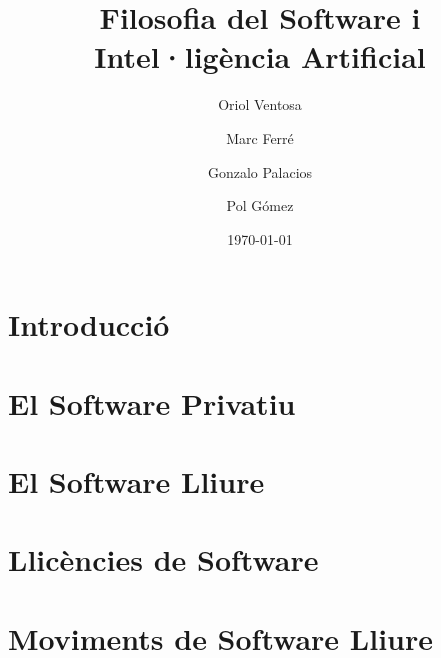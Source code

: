 \documentclass[a4paper,12pt]{report}
\begin{document}
\title{
	{\bf Filosofia del Software i Intel·ligència Artificial}
}
\author{
	Oriol Ventosa \and
	Marc Ferré \and
	Gonzalo Palacios \and
	Pol Gómez
}
\date{\today}
\maketitle

\tableofcontents

\chapter{Introducció}


\chapter{El Software Privatiu}


\chapter{El Software Lliure}


\chapter{Llicències de Software}


\chapter{Moviments de Software Lliure}




\end{document}
